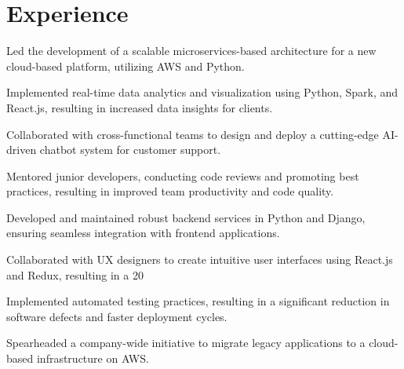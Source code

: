 \documentclass[]{deedy-resume-multilatex}
\begin{document}
%
%
\lastupdated

%
%

%
%

\begin{minipage}[t]{0.60\textwidth}


\section{Experience}
\vspace{\topsep} %
\begin{tightemize}
\item Led the development of a scalable microservices-based architecture for a new cloud-based platform, utilizing AWS and Python.
\item Implemented real-time data analytics and visualization using Python, Spark, and React.js, resulting in increased data insights for clients.
\item Collaborated with cross-functional teams to design and deploy a cutting-edge AI-driven chatbot system for customer support.
\item Mentored junior developers, conducting code reviews and promoting best practices, resulting in improved team productivity and code quality.
\end{tightemize}
\sectionsep

\begin{tightemize}
\item Developed and maintained robust backend services in Python and Django, ensuring seamless integration with frontend applications.
\item Collaborated with UX designers to create intuitive user interfaces using React.js and Redux, resulting in a 20%
\item Implemented automated testing practices, resulting in a significant reduction in software defects and faster deployment cycles.
\item Spearheaded a company-wide initiative to migrate legacy applications to a cloud-based infrastructure on AWS.
\end{tightemize}
\sectionsep


\end{minipage}
\end{document}
